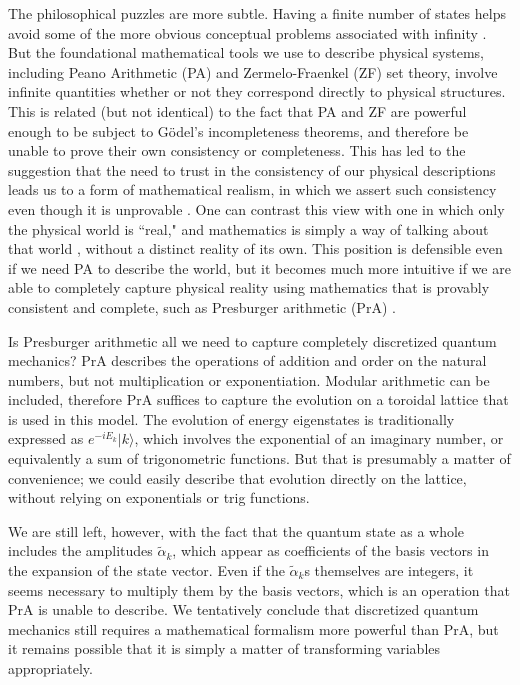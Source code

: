 \documentclass[aps,prd,nofootinbib,notitlepage,12pt]{revtex4-2}
\begin{document}
The philosophical puzzles are more subtle.
Having a finite number of states helps avoid some of the more obvious conceptual problems associated with infinity \cite{sep-infinity}.
But the foundational mathematical tools we use to describe physical systems, including Peano Arithmetic (PA) and Zermelo-Fraenkel (ZF)  set theory, involve infinite quantities whether or not they correspond directly to physical structures.
This is related (but not identical) to the fact that PA and ZF are powerful enough to be subject to G\"odel's incompleteness theorems, and therefore be unable to prove their own consistency or completeness.
This has led to the suggestion that the need to trust in the consistency of our physical descriptions leads us to a form of mathematical realism, in which we assert such consistency even though it is unprovable \cite{putnam1975mathematical}.
One can contrast this view with one in which only the physical world is ``real," and mathematics is simply a way of talking about that world \cite{CarrollManuscript-CARRRK}, without a distinct reality of its own.
This position is defensible even if we need PA to describe the world, but it becomes much more intuitive if we are able to completely capture physical reality using mathematics that is provably consistent and complete, such as Presburger arithmetic (PrA) \cite{presburger1929uber,haase}.

Is Presburger arithmetic all we need to capture completely discretized quantum mechanics?
PrA describes the operations of addition and order on the natural numbers, but not multiplication or exponentiation.
Modular arithmetic can be included, therefore PrA suffices to capture the evolution on a toroidal lattice that is used in this model.
The evolution of energy eigenstates is traditionally expressed as $e^{-iE_k}|k\rangle$, which involves the exponential of an imaginary number, or equivalently a sum of trigonometric functions.
But that is presumably a matter of convenience; we could easily describe that evolution directly on the lattice, without relying on exponentials or trig functions.

We are still left, however, with the fact that the quantum state as a whole includes the amplitudes $\tilde\alpha_k$, which appear as coefficients of the basis vectors in the expansion of the state vector.
Even if the $\tilde\alpha_k$s themselves are integers, it seems necessary to multiply them by the basis vectors, which is an operation that PrA is unable to describe.
We tentatively conclude that discretized quantum mechanics still requires a mathematical formalism more powerful than PrA, but it remains possible that it is simply a matter of transforming variables appropriately.
\end{document}
